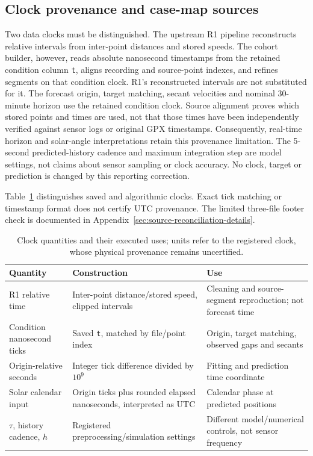 \documentclass[11pt]{article}
\begin{document}
\subsection{Clock provenance and case-map sources}
\label{sec:clock-and-map-provenance}
Two data clocks must be distinguished. The upstream R1 pipeline reconstructs
relative intervals from inter-point distances and stored speeds. The cohort builder,
however, reads absolute nanosecond timestamps from the retained condition
column \texttt{t}, aligns recording and source-point indexes, and refines
segments on that condition clock. R1's reconstructed intervals are not
substituted for it. The forecast origin, target matching, secant velocities
and nominal 30-minute horizon use the retained condition clock. Source
alignment proves which stored points and times are used, not that those
times have been independently verified against sensor logs or original GPX
timestamps. Consequently, real-time horizon and solar-angle interpretations
retain this provenance limitation. The 5-second predicted-history cadence
and maximum integration step are model settings, not claims about sensor
sampling or clock accuracy. No clock, target or prediction is changed by
this reporting correction.

Table~\ref{tab:clock-use} distinguishes saved and algorithmic clocks.
Exact tick matching or timestamp format does not certify UTC provenance.
The limited three-file footer check is documented in
Appendix~\ref{sec:source-reconciliation-details}.

\begin{table}[htbp]
\centering\small
\caption{Clock quantities and their executed uses; units refer to the
registered clock, whose physical provenance remains uncertified.}
\label{tab:clock-use}
\begin{tabular}{@{}p{.25\linewidth}p{.36\linewidth}p{.32\linewidth}@{}}
\toprule
Quantity & Construction & Use\\
\midrule
R1 relative time & Inter-point distance/stored speed, clipped intervals &
Cleaning and source-segment reproduction; not forecast time\\
Condition nanosecond ticks & Saved \texttt{t}, matched by file/point index &
Origin, target matching, observed gaps and secants\\
Origin-relative seconds & Integer tick difference divided by \(10^9\) &
Fitting and prediction time coordinate\\
Solar calendar input & Origin ticks plus rounded elapsed nanoseconds,
interpreted as UTC & Calendar phase at predicted positions\\
\(\tau\), history cadence, \(h\) & Registered preprocessing/simulation settings &
Different model/numerical controls, not sensor frequency\\
\bottomrule
\end{tabular}
\end{table}
\end{document}

